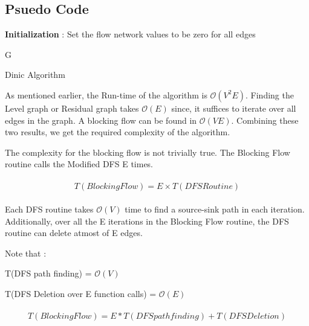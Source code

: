 \documentclass[paper=a4, fontsize=11pt]{scrartcl} %
\numberwithin{equation}{section} %
\numberwithin{figure}{section} %
\numberwithin{table}{section} %
\begin{document}
\subsection{Psuedo Code}

\begin{algorithm}[H]
\textbf{Initialization} : Set the flow network values to be zero for all edges \;

\Return G
\caption{Dinic Algorithm}
\end{algorithm}


As mentioned earlier, the Run-time of the algorithm is $\mathcal{O}(V^2E)$. Finding the Level graph or Residual graph takes $\mathcal{O}(E)$ since, it suffices to iterate over all edges in the graph. A blocking flow can be found in $\mathcal{O}(VE)$. Combining these two results, we get the required complexity of the algorithm.

The complexity for the blocking flow is not trivially true. The Blocking Flow routine calls the Modified DFS E times. 

\begin{align} 
\begin{split}
T(Blocking Flow) = E \times T(DFS Routine)
\end{split}					
\end{align}

Each DFS routine takes $\mathcal{O}(V)$ time to find a source-sink path in each iteration. Additionally, over all the E iterations in the Blocking Flow routine, the DFS routine can delete atmost of E edges.

Note that :

T(DFS path finding) = $\mathcal{O}(V)$

T(DFS Deletion over E function calls) = $\mathcal{O}(E)$

\begin{align} 
\begin{split}
T(Blocking Flow) = E * T(DFS path finding) + T(DFS Deletion )
\end{split}					
\end{align}
\end{document}
